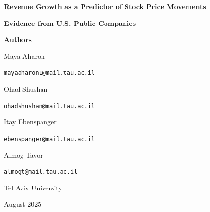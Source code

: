 \documentclass[11pt]{article}
\begin{document}
\begin{titlepage}
    \begin{center}
        \vspace*{\fill}
        {\Huge\bfseries Revenue Growth as a Predictor of Stock Price Movements \par}
        \vspace{0.3cm}
        {\LARGE\bfseries Evidence from U.S. Public Companies \par}
        \vspace{2.5cm}
        {\Large\bfseries Authors \par}
        \vspace{1cm}
        {\large
        Maya Aharon \par
        \texttt{mayaaharon1@mail.tau.ac.il} \par
        \vspace{0.5cm}
        Ohad Shushan \par
        \texttt{ohadshushan@mail.tau.ac.il} \par
        \vspace{0.5cm}
        Itay Ebenspanger \par
        \texttt{ebenspanger@mail.tau.ac.il} \par
        \vspace{0.5cm}
        Almog Tavor \par
        \texttt{almogt@mail.tau.ac.il} \par
        }
        \vspace{2cm}
        {\Large Tel Aviv University \par}
        {\large August 2025 \par}
        \vspace*{\fill}
    \end{center}
    \thispagestyle{empty}
\end{titlepage}

\begin{abstract}
We examine whether revenue growth serves as a predictor of future stock price movements for U.S. public companies. Using quarterly financial data from over 5,000 firms spanning 2020–2024, we test the relationship between year-over-year revenue growth and forward-looking stock price changes across multiple time horizons (6 months to 3 years). While initially investigating free cash flow growth, we find revenue growth demonstrates superior predictive power.

To answer this, we apply least squares regression with resistance standard errors, controlling for outliers and grouping firms by size and index inclusion. We compare revenue and cash flow metrics across horizons and market segments.

The results reveal a consistent, statistically significant positive relationship between revenue growth and future returns, especially for large-cap and index-listed firms. However, explanatory power remains modest ($R^2$ typically below 0.1), limiting standalone investment applications.

These findings suggest revenue growth carries meaningful predictive information, though best used as part of a broader, multi-factor approach.
\end{abstract}
\end{document}
